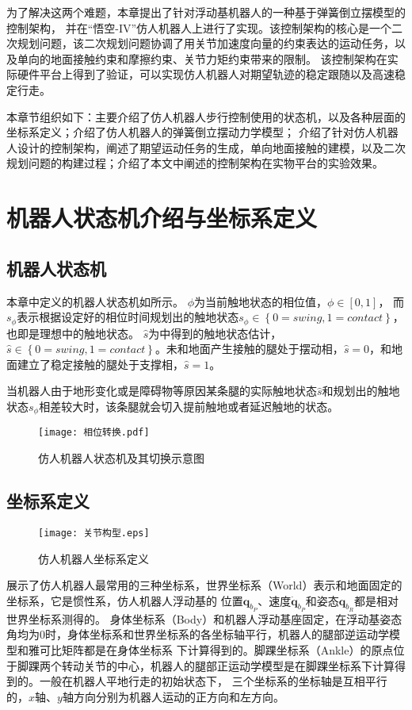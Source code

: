为了解决这两个难题，本章提出了针对浮动基机器人的一种基于弹簧倒立摆模型的控制架构，
并在“悟空-IV”仿人机器人上进行了实现。该控制架构的核心是一个二次规划问题，该二次规划问题协调了用关节加速度向量的约束表达的运动任务，以及单向的地面接触约束和摩擦约束、关节力矩约束带来的限制。
该控制架构在实际硬件平台上得到了验证，可以实现仿人机器人对期望轨迹的稳定跟随以及高速稳定行走。

本章节组织如下：主要介绍了仿人机器人步行控制使用的状态机，以及各种层面的坐标系定义；介绍了仿人机器人的弹簧倒立摆动力学模型；
介绍了针对仿人机器人设计的控制架构，阐述了期望运动任务的生成，单向地面接触的建模，以及二次规划问题的构建过程；介绍了本文中阐述的控制架构在实物平台的实验效果。
\section{机器人状态机介绍与坐标系定义}
\label{sec:state_machine}
\subsection{机器人状态机}
本章中定义的机器人状态机如所示。
$\phi$为当前触地状态的相位值，$\phi \in \left[0, 1\right]$，
而$s_{\phi}$表示根据设定好的相位时间规划出的触地状态$s_{\phi} \in \left\{0=swing, 1=contact\right\}$，
也即是理想中的触地状态。
$\hat s$为中得到的触地状态估计，$\hat s \in \left\{0=swing, 1=contact\right\}$。未和地面产生接触的腿处于摆动相，$\hat s = 0$，和地面建立了稳定接触的腿处于支撑相，$\hat s = 1$。

当机器人由于地形变化或是障碍物等原因某条腿的实际触地状态$\hat s$和规划出的触地状态$s_{\phi}$相差较大时，该条腿就会切入提前触地或者延迟触地的状态。
\begin{figure}[htbp]
    \centering
    \texttt{[image: 相位转换.pdf]}
    \caption{\label{fig:state_machine}仿人机器人状态机及其切换示意图}
\end{figure}
\subsection{坐标系定义}
\begin{figure}[htbp]
    \centering
    \texttt{[image: 关节构型.eps]}
    \caption{\label{fig:coordination}仿人机器人坐标系定义}
\end{figure}
展示了仿人机器人最常用的三种坐标系，世界坐标系（World）表示和地面固定的坐标系，它是惯性系，仿人机器人浮动基的
位置$\boldsymbol{q}_{b_P}$、速度$ \dot {\boldsymbol{q}}_{b_P}$和姿态$\boldsymbol{q}_{b_R}$都是相对世界坐标系测得的。
身体坐标系（Body）和机器人浮动基座固定，在浮动基姿态角均为0时，身体坐标系和世界坐标系的各坐标轴平行，机器人的腿部逆运动学模型和雅可比矩阵都是在身体坐标系
下计算得到的。脚踝坐标系（Ankle）的原点位于脚踝两个转动关节的中心，机器人的腿部正运动学模型是在脚踝坐标系下计算得到的。一般在机器人平地行走的初始状态下，
三个坐标系的坐标轴是互相平行的，$x$轴、$y$轴方向分别为机器人运动的正方向和左方向。

